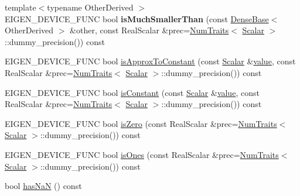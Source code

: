 \begin{DoxyCompactItemize}
{\footnotesize template$<$typename Other\+Derived $>$ }\\E\+I\+G\+E\+N\+\_\+\+D\+E\+V\+I\+C\+E\+\_\+\+F\+U\+NC bool {\bfseries is\+Much\+Smaller\+Than} (const \mbox{\hyperlink{class_eigen_1_1_dense_base}{Dense\+Base}}$<$ Other\+Derived $>$ \&other, const Real\+Scalar \&prec=\mbox{\hyperlink{struct_eigen_1_1_num_traits}{Num\+Traits}}$<$ \mbox{\hyperlink{class_eigen_1_1_dense_base_a5feed465b3a8e60c47e73ecce83e39a2}{Scalar}} $>$\+::dummy\+\_\+precision()) const
\item 
E\+I\+G\+E\+N\+\_\+\+D\+E\+V\+I\+C\+E\+\_\+\+F\+U\+NC bool \mbox{\hyperlink{class_eigen_1_1_dense_base_aafb86c9868d3d9076e01e4fc54c93e81}{is\+Approx\+To\+Constant}} (const \mbox{\hyperlink{class_eigen_1_1_dense_base_a5feed465b3a8e60c47e73ecce83e39a2}{Scalar}} \&\mbox{\hyperlink{class_eigen_1_1_dense_base_a8da735a6bfc7012606acf787156d10a0}{value}}, const Real\+Scalar \&prec=\mbox{\hyperlink{struct_eigen_1_1_num_traits}{Num\+Traits}}$<$ \mbox{\hyperlink{class_eigen_1_1_dense_base_a5feed465b3a8e60c47e73ecce83e39a2}{Scalar}} $>$\+::dummy\+\_\+precision()) const
\item 
E\+I\+G\+E\+N\+\_\+\+D\+E\+V\+I\+C\+E\+\_\+\+F\+U\+NC bool \mbox{\hyperlink{class_eigen_1_1_dense_base_aba0e5df04cf80214d8298aa8dd41acbd}{is\+Constant}} (const \mbox{\hyperlink{class_eigen_1_1_dense_base_a5feed465b3a8e60c47e73ecce83e39a2}{Scalar}} \&\mbox{\hyperlink{class_eigen_1_1_dense_base_a8da735a6bfc7012606acf787156d10a0}{value}}, const Real\+Scalar \&prec=\mbox{\hyperlink{struct_eigen_1_1_num_traits}{Num\+Traits}}$<$ \mbox{\hyperlink{class_eigen_1_1_dense_base_a5feed465b3a8e60c47e73ecce83e39a2}{Scalar}} $>$\+::dummy\+\_\+precision()) const
\item 
E\+I\+G\+E\+N\+\_\+\+D\+E\+V\+I\+C\+E\+\_\+\+F\+U\+NC bool \mbox{\hyperlink{class_eigen_1_1_dense_base_aad9b1b1368b249e0e0f14b7f2960fb58}{is\+Zero}} (const Real\+Scalar \&prec=\mbox{\hyperlink{struct_eigen_1_1_num_traits}{Num\+Traits}}$<$ \mbox{\hyperlink{class_eigen_1_1_dense_base_a5feed465b3a8e60c47e73ecce83e39a2}{Scalar}} $>$\+::dummy\+\_\+precision()) const
\item 
E\+I\+G\+E\+N\+\_\+\+D\+E\+V\+I\+C\+E\+\_\+\+F\+U\+NC bool \mbox{\hyperlink{class_eigen_1_1_dense_base_a91fb1c80e1fd4970a16fd509764225d7}{is\+Ones}} (const Real\+Scalar \&prec=\mbox{\hyperlink{struct_eigen_1_1_num_traits}{Num\+Traits}}$<$ \mbox{\hyperlink{class_eigen_1_1_dense_base_a5feed465b3a8e60c47e73ecce83e39a2}{Scalar}} $>$\+::dummy\+\_\+precision()) const
\item 
bool \mbox{\hyperlink{class_eigen_1_1_dense_base_ab13d158c900560d3e1b25d85d2d33dd6}{has\+NaN}} () const

\end{DoxyCompactItemize}
